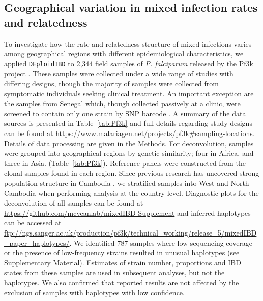 \documentclass[9pt,lineno]{elife}
\begin{document}
\subsection{Geographical variation in mixed infection rates and relatedness}

To investigate how the rate and relatedness structure of mixed infections varies among geographical regions with different epidemiological characteristics, we applied \texttt{DEploidIBD} to 2,344 field samples of {\it P. falciparum} released by the Pf3k project \citep{pf3k}.  These samples were collected under a wide range of studies with differing designs, though the majority of samples were collected from symptomatic individuals seeking clinical treatment. An important exception are the samples from Senegal which, though collected passively at a clinic, were screened to contain only one strain by SNP barcode \citep{Daniels2015}.  A summary of the data sources is presented in Table~\ref{tab:Pf3k} and full details regarding study designs can be found at \url{https://www.malariagen.net/projects/pf3k#sampling-locations}. Details of data processing are given in the Methods. For deconvolution, samples were grouped into geographical regions by genetic similarity; four in Africa, and three in Asia. (Table~\ref{tab:Pf3k}). Reference panels were constructed from the clonal samples found in each region. Since previous research has uncovered strong population structure in Cambodia \citep{Miotto2013}, we stratified samples into West and North Cambodia when performing analysis at the country level. Diagnostic plots for the deconvolution of all samples can be found at \url{https://github.com/mcveanlab/mixedIBD-Supplement} and inferred haplotypes can be accessed at \url{ftp://ngs.sanger.ac.uk/production/pf3k/technical_working/release_5/mixedIBD_paper_haplotypes/}. We identified 787 samples where low sequencing coverage or the presence of low-frequency strains resulted in unusual haplotypes (see Supplementary Material). Estimates of strain number, proportions and IBD states from these samples are used in subsequent analyses, but not the haplotypes. We also confirmed that reported results are not affected by the exclusion of samples with haplotypes with low confidence.
\end{document}

